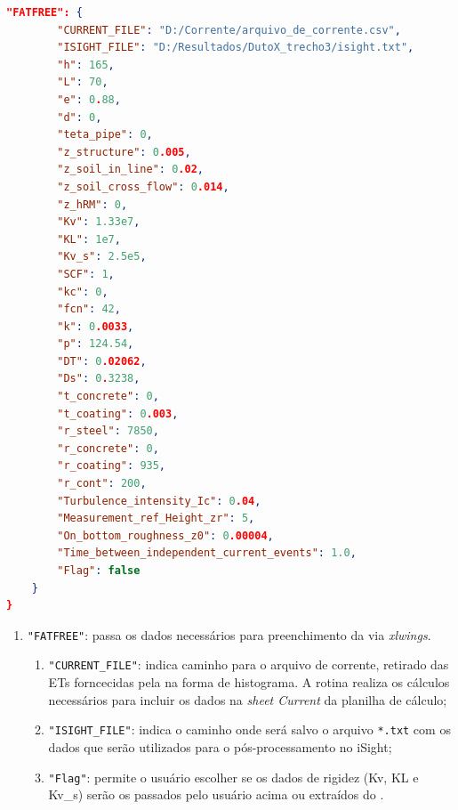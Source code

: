 \begin{lstlisting}[firstnumber=207, language=json, label={tab:jdsn-arquivojson7}, caption={Exemplo de arquivo de entrada de dados - Parte 7/7}]
    "FATFREE": {
        "CURRENT_FILE": "D:/Corrente/arquivo_de_corrente.csv",
        "ISIGHT_FILE": "D:/Resultados/DutoX_trecho3/isight.txt",
        "h": 165,
        "L": 70,
        "e": 0.88,
        "d": 0,
        "teta_pipe": 0,
        "z_structure": 0.005,
        "z_soil_in_line": 0.02,
        "z_soil_cross_flow": 0.014,
        "z_hRM": 0,
        "Kv": 1.33e7,
        "KL": 1e7,
        "Kv_s": 2.5e5,
        "SCF": 1,
        "kc": 0,
        "fcn": 42,
        "k": 0.0033,
        "p": 124.54,
        "DT": 0.02062,
        "Ds": 0.3238,
        "t_concrete": 0,
        "t_coating": 0.003,
        "r_steel": 7850,
        "r_concrete": 0,
        "r_coating": 935,
        "r_cont": 200,
        "Turbulence_intensity_Ic": 0.04,
        "Measurement_ref_Height_zr": 5,
        "On_bottom_roughness_z0": 0.00004,
        "Time_between_independent_current_events": 1.0,
        "Flag": false
    }
}
\end{lstlisting}

\begin{enumerate}
    \item \texttt{"FATFREE"}: passa os dados necessários para preenchimento da \fatfree via \textit{xlwings}.
    \begin{enumerate}
        \item \texttt{"CURRENT\_FILE"}: indica caminho para o arquivo de corrente, retirado das ETs forncecidas pela na forma de histograma. A rotina realiza os cálculos necessários para incluir os dados na \textit{sheet Current} da planilha de cálculo;
        \item \texttt{"ISIGHT\_FILE"}: indica o caminho onde será salvo o arquivo \texttt{*.txt} com os dados que serão utilizados para o pós-processamento no iSight;
        \item \texttt{"Flag"}: permite o usuário escolher se os dados de rigidez (Kv, KL e  Kv\_s) serão os passados pelo usuário acima ou extraídos do \abaqus.
    \end{enumerate}
\end{enumerate}
